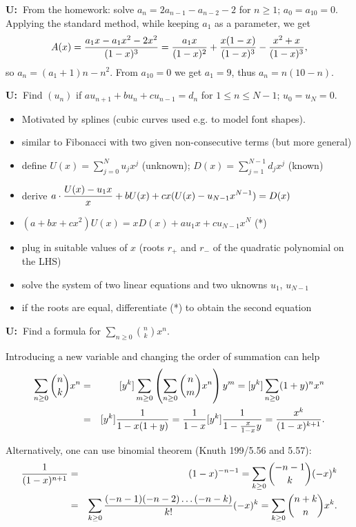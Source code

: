 \documentclass[10pt, a4paper]{article}
\newcommand*\ruleline[1]{\par\noindent\raisebox{.8ex}{\makebox[\linewidth]{\hrulefill\hspace{1ex}\raisebox{-.8ex}{#1}\hspace{1ex}\hrulefill}}}
\def\U{{\bf U:\ }}
\begin{document}
\U From the homework: solve $a_n = 2a_{n-1}-a_{n-2}-2$ for $n\ge 1$; $a_0=a_{10}=0$.\\
Applying the standard method, while keeping $a_1$ as a parameter, we get
$$
A(x)={a_1x-a_1x^2-2x^2\over (1-x)^3}={a_1x\over (1-x)^2}+{x(1-x)\over (1-x)^3}-{x^2+x\over (1-x)^3},
$$
so $a_n=(a_1+1)n-n^2$. From $a_{10}=0$ we get $a_1=9$, thus $a_n=n(10-n)$.

\ruleline{Another way for boundary problems (Wilf 10--11)}

\U Find $(u_n)$ if $au_{n+1}+bu_n+cu_{n-1}=d_n$ for $1\le n\le N-1$; $u_0=u_N=0$.
\begin{itemize}[label=--]
    \item Motivated by splines (cubic curves used e.g. to model font shapes).
    \item similar to Fibonacci with two given non-consecutive terms (but more general)
    \item define $U(x)= \sum_{j=0}^N u_jx^j$ (unknown); $D(x)=\sum_{j=1}^{N-1} d_jx^j$ (known)
    \item derive $\displaystyle a\cdot {U(x)-u_1x\over x}+bU(x)+cx(U(x)-u_{N-1}x^{N-1}) = D(x)$
    \item $(a+bx+cx^2) U(x) = x D(x)  +au_1x + cu_{N-1}x^N$ (*)
    \item plug in suitable values of $x$ (roots $r_{+}$ and $r_{-}$ of the quadratic polynomial on the LHS)
    \item solve the system of two linear equations and two uknowns $u_1$, $u_{N-1}$
    \item if the roots are equal, differentiate (*) to obtain the second equation
\end{itemize}

\ruleline{GFs of two variables}

\U Find a formula for $\displaystyle\sum_{n\ge 0} \binom{n}{k} x^n$.

Introducing a new variable and changing the order of summation can help
\begin{eqnarray}
    \sum_{n\ge 0} {n\choose k}x^n &=& [y^k]\sum_{m\ge 0} \left(\sum_{n\ge 0} {n\choose m}x^n\right)y^m = [y^k]\sum_{n\ge 0} (1+y)^nx^n\nonumber\\
    &=& [y^k] {1\over 1-x(1+y)} = {1\over 1-x}[y^k] {1\over 1-{x\over 1-x}y} = {x^k\over (1-x)^{k+1}}. \label{binomial}
\end{eqnarray}

Alternatively, one can use binomial theorem (Knuth 199/5.56 and 5.57):
\begin{eqnarray*}
    {1\over (1-x)^{n+1}} &=& (1-x)^{-n-1} =\sum_{k\ge 0} {-n-1\choose k}(-x)^k\\
                            &=& \sum_{k\ge 0} {(-n-1)(-n-2)\dots(-n-k)\over k!}(-x)^k = \sum_{k\ge 0} {n+k\choose n}x^k.
\end{eqnarray*}
\end{document}
